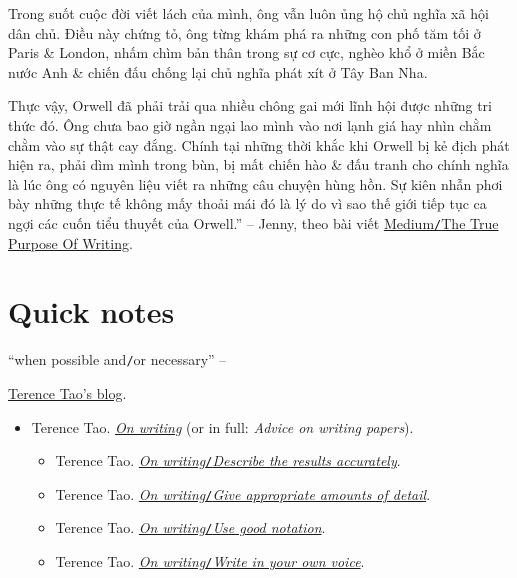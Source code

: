 \documentclass[oneside]{book}
\numberwithin{equation}{section}
\begin{document}
Trong suốt cuộc đời viết lách của mình, ông vẫn luôn ủng hộ chủ nghĩa xã hội dân chủ. Điều này chứng tỏ, ông từng khám phá ra những con phố tăm tối ở Paris \& London, nhấm chìm bản thân trong sự cơ cực, nghèo khổ ở miền Bắc nước Anh \& chiến đấu chống lại chủ nghĩa phát xít ở Tây Ban Nha.

Thực vậy, Orwell đã phải trải qua nhiều chông gai mới lĩnh hội được những tri thức đó. Ông chưa bao giờ ngần ngại lao mình vào nơi lạnh giá hay nhìn chằm chằm vào sự thật cay đắng. Chính tại những thời khắc khi Orwell bị kẻ địch phát hiện ra, phải dìm mình trong bùn, bị mất chiến hào \& đấu tranh cho chính nghĩa là lúc ông có nguyên liệu viết ra những câu chuyện hùng hồn. Sự kiên nhẫn phơi bày những thực tế không mấy thoải mái đó là lý do vì sao thế giới tiếp tục ca ngợi các cuốn tiểu thuyết của Orwell.'' -- Jenny, theo bài viết \href{https://medium.com/personal-growth/george-orwell-why-your-writing-must-have-purpose-77a3e94d6692}{Medium\texttt{/}The True Purpose Of Writing}.


\appendix

\section*{Quick notes}
``when possible and\texttt{/}or necessary'' -- \cite[p. 47]{Rebollo_Lewandowski2014}



\begin{thebibliography}{99}
	 \href{https://terrytao.wordpress.com}{Terence Tao's blog}.
	\begin{itemize}
		\item Terence Tao. \href{https://terrytao.wordpress.com/advice-on-writing-papers/}{\textit{On writing}} (or in full: \textit{Advice on writing papers}).
		\begin{itemize}
			\item Terence Tao. \href{https://terrytao.wordpress.com/advice-on-writing-papers/describe-the-results-accurately/}{\textit{On writing}\texttt{/}\textit{Describe the results accurately}}.
			\item Terence Tao. \href{https://terrytao.wordpress.com/advice-on-writing-papers/give-appropriate-amounts-of-detail/}{\textit{On writing}\texttt{/}\textit{Give appropriate amounts of detail}}.
			\item Terence Tao. \href{https://terrytao.wordpress.com/advice-on-writing-papers/use-good-notation/}{\textit{On writing}\texttt{/}\textit{Use good notation}}.
			\item Terence Tao. \href{https://terrytao.wordpress.com/advice-on-writing-papers/write-in-your-own-voice/}{\textit{On writing}\texttt{/}\textit{Write in your own voice}}.
		\end{itemize}
	\end{itemize}
\end{thebibliography}


\printbibliography[heading=bibintoc]
	
\end{document}
